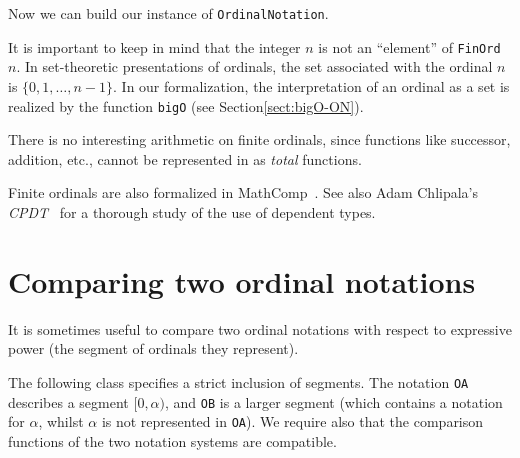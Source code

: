 


Now we can build our instance of \texttt{OrdinalNotation}.



\begin{remark}
It is important to keep in mind  that the integer $n$ is not an ``element'' of \texttt{FinOrd $n$}. In set-theoretic presentations of ordinals, the set associated with the ordinal $n$ is $\{0,1,\dots,n-1\}$. 
In our formalization, the interpretation of an ordinal as a set is realized by the function \texttt{bigO} (see Section\vref{sect:bigO-ON}).
\end{remark}


\begin{remark}
 There is no interesting arithmetic on finite ordinals, since functions like successor, addition, etc.,  cannot be represented in \coq{} as \emph{total} functions.
\end{remark}

\begin{remark}
Finite ordinals are also formalized in MathComp~\cite{MCB}.  See also Adam Chlipala's \emph{CPDT}~\cite{chlipalacpdt2011} for a thorough study of the use of dependent types.  
\end{remark}




\section{Comparing two ordinal notations}

It is sometimes useful to compare two ordinal notations with respect to expressive power
(the segment of ordinals  they represent). 

The following class specifies a strict inclusion of segments. The notation \texttt{OA} describes a segment $[0,\alpha)$, and \texttt{OB} is a larger segment (which contains a notation for $\alpha$, whilst $\alpha$ is not represented in \texttt{OA}). We require also  that the comparison functions of the two notation systems are compatible.

